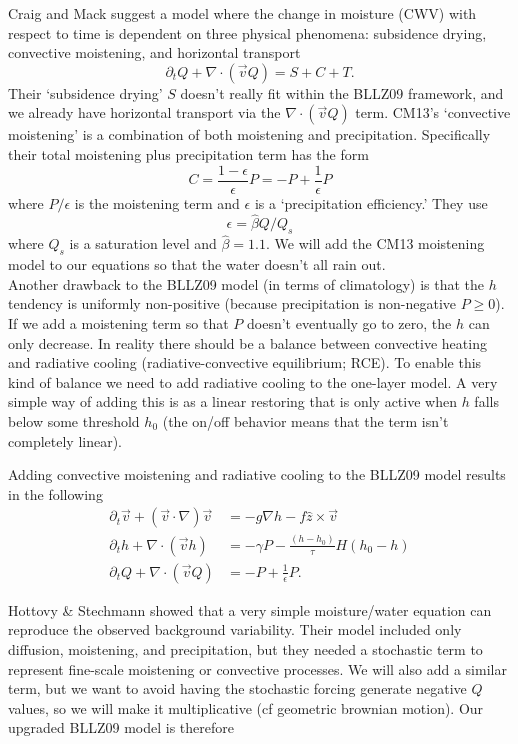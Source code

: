 \documentclass[10pt]{article}
\begin{document}
Craig and Mack suggest a model where the change in moisture (CWV) with respect to time is dependent on three physical phenomena: subsidence drying, convective moistening, and horizontal transport
\[\partial_t Q + \nabla \cdot \left(\vec{v}Q\right) = S + C + T.\]
Their `subsidence drying' $S$ doesn't really fit within the BLLZ09 framework, and we already have horizontal transport via the $\nabla\cdot(\vec{v}Q)$ term.
CM13's `convective moistening' is a combination of both moistening and precipitation.
Specifically their total moistening plus precipitation term has the form
\[C = \frac{1-\epsilon}{\epsilon} P = -P +\frac{1}{\epsilon}P\]
where $P/\epsilon$ is the moistening term and $\epsilon$ is a `precipitation efficiency.'
They use 
\[\epsilon = \hat{\beta}Q/Q_s\]
where $Q_s$ is a saturation level and $\hat{\beta} = 1.1$.
We will add the CM13 moistening model to our equations so that the water doesn't all rain out.\\

Another drawback to the BLLZ09 model (in terms of climatology) is that the $h$ tendency is uniformly non-positive (because precipitation is non-negative $P\ge0$).
If we add a moistening term so that $P$ doesn't eventually go to zero, the $h$ can only decrease.
In reality there should be a balance between convective heating and radiative cooling (radiative-convective equilibrium; RCE).
To enable this kind of balance we need to add radiative cooling to the one-layer model.
A very simple way of adding this is as a linear restoring that is only active when $h$ falls below some threshold $h_0$ (the on/off behavior means that the term isn't completely linear).

Adding convective moistening and radiative cooling to the BLLZ09 model results in the following
\begin{align}
\partial_t \vec{v} + \left( \vec{v}\cdot \nabla \right)\vec{v} &= -g\nabla h - f\hat{z}\times \vec{v}\\
\partial_t h + \nabla \cdot \left(\vec{v}h\right) &= -\gamma P -\frac{(h-h_0)}{\tau}H(h_0-h)\\
\partial_t Q + \nabla \cdot \left(\vec{v}Q\right) &= -P + \frac{1}{\epsilon}P.
\end{align}

Hottovy \& Stechmann showed that a very simple moisture/water equation can reproduce the observed background variability.
Their model included only diffusion, moistening, and precipitation, but they needed a stochastic term to represent fine-scale moistening or convective processes.
We will also add a similar term, but we want to avoid having the stochastic forcing generate negative $Q$ values, so we will make it multiplicative (cf geometric brownian motion).
Our upgraded BLLZ09 model is therefore
\end{document}
